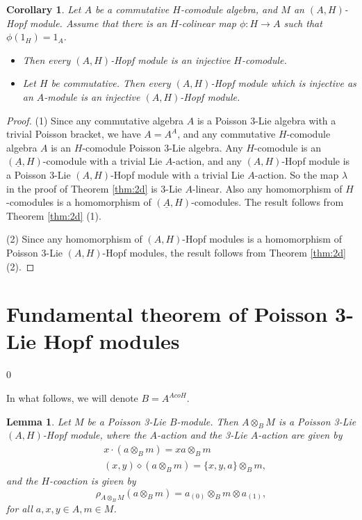 \documentclass[11pt]{article}
\newtheorem{lemma}[theorem]{Lemma}
\newtheorem{corollary}[theorem]{Corollary}
\def\di{\diamond}
\def\ot{\otimes}
\begin{document}
\begin{corollary}
Let $A$ be a commutative $H$-comodule algebra, and $M$ an $(A, H)$-Hopf module. Assume that there is an $H$-colinear map $\phi:H\rightarrow A$ such that $\phi(1_H)=1_A$.
\begin{itemize}
  \item [(1)] Then every $(A, H)$-Hopf module is an injective $H$-comodule.
  \item [(2)] Let $H$ be commutative. Then every $(A, H)$-Hopf module which is injective as an $A$-module is an injective $(A, H)$-Hopf module.
\end{itemize}
\end{corollary}

\begin{proof}
(1) Since any commutative algebra $A$ is a Poisson 3-Lie algebra with a trivial Poisson bracket, we have $A=A^A$, and any commutative $H$-comodule algebra $A$ is an $H$-comodule Poisson 3-Lie algebra. Any $H$-comodule is an $(\underline{A}, H)$-comodule with a trivial Lie $A$-action, and any $(A, H)$-Hopf module is a Poisson 3-Lie $(A, H)$-Hopf module with a trivial Lie $A$-action. So the map $\lambda$ in the proof of Theorem \ref{thm:2d} is 3-Lie $A$-linear. Also any homomorphism of $H$-comodules is a homomorphism of $(\underline{A}, H)$-comodules. The result follows from Theorem \ref{thm:2d} (1).

(2) Since any homomorphism of $(A, H)$-Hopf modules is a homomorphism of Poisson 3-Lie $(A, H)$-Hopf modules, the result follows from Theorem \ref{thm:2d}(2).
\end{proof}

\vspace{2mm}

\section{Fundamental theorem of Poisson 3-Lie Hopf modules}
\def\theequation{3.\arabic{equation}}
\setcounter{equation} {0}


In what follows, we will denote $B=A^{AcoH}$.
\begin{lemma}\label{lem:3a}
Let $M$ be a Poisson 3-Lie $B$-module. Then $A\ot_BM$ is a Poisson 3-Lie $(A,H)$-Hopf module, where the $A$-action and the 3-Lie $A$-action are given by
\begin{align*}
&x\cdot (a\ot_B m)=xa\ot_Bm\\
&(x,y)\di (a\ot_B m)=\{x,y, a\}\ot_Bm,
\end{align*}
and the $H$-coaction is given by
$$\rho_{A\ot_BM}(a\ot_B m)=a_{(0)}\ot_Bm\ot a_{(1)},$$
for all $a,x,y\in A,m\in M$.
\end{lemma}
\end{document}
